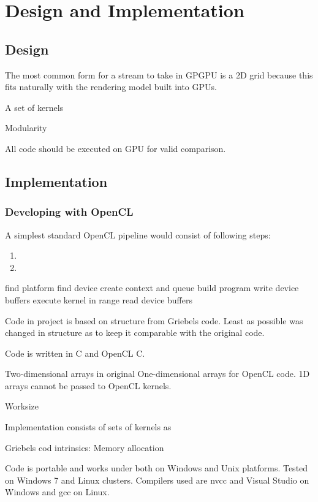 \chapter{Design and Implementation}

\section{Design}

The most common form for a stream to take in GPGPU is a 2D grid because this fits naturally with the rendering model built into GPUs.

A set of kernels

Modularity

All code should be executed on GPU for valid comparison. 

\section{Implementation}

\subsection{Developing with OpenCL}
A simplest standard OpenCL pipeline would consist of following steps:

\begin{enumerate}
\item 
\item
\end{enumerate}
find platform
find device
create context and queue
build program
write device buffers
execute kernel in range
read device buffers



Code in project is based on structure from Griebels code\cite{griebel1998numerical}. Least as possible was changed in structure as to keep it comparable with the original code.

Code is written in C and OpenCL C.

Two-dimensional arrays in original 
One-dimensional arrays for OpenCL code. 1D arrays cannot be passed to OpenCL kernels.

Worksize

Implementation consists of sets of kernels as 

Griebels cod intrinsics: Memory allocation

Code is portable and works under both on Windows and Unix platforms. Tested on Windows 7 and Linux clusters. Compilers used are nvcc and Visual Studio on Windows and gcc on Linux.

